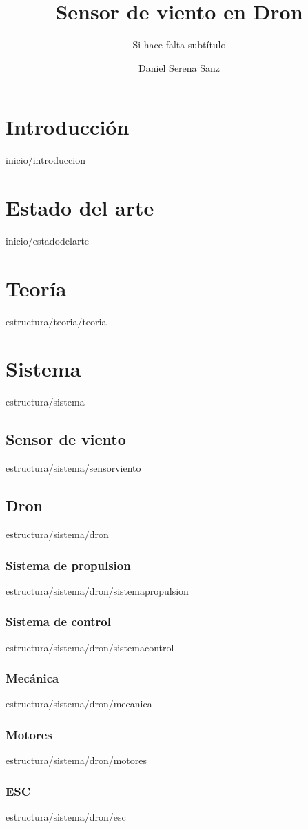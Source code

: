 \documentclass[epsbased,copyright,final,printable,covers,extendedindex,firstnumbered,tfg,gnuplot]{tfgtfmthesisuam}
\title{Sensor de viento en Dron}
\subtitle{Si hace falta subtítulo}
\author{Daniel Serena Sanz}
\begin{document}
\chapter{Introducción\label{CAP:INTRODUCCION}}{inicio/introduccion}
\chapter{Estado del arte\label{CAP:ESTADODELARTE}}{inicio/estadodelarte}
\chapter{Teoría\label{CAP:INTRODUCCION}}{estructura/teoria/teoria}
\chapter{Sistema\label{CAP:SISTEMA}}{estructura/sistema}

	\section{Sensor de viento\label{SEC:SENSORVIENTO}}{estructura/sistema/sensorviento}

	\section{Dron\label{SEC:DRON}}{estructura/sistema/dron}
		\subsection{Sistema de propulsion\label{SS:SISTPROPULSION}}{estructura/sistema/dron/sistemapropulsion}
		\subsection{Sistema de control\label{SS:SISTCONTROL}}{estructura/sistema/dron/sistemacontrol}
		\subsection{Mecánica\label{SS:MECANICA}}{estructura/sistema/dron/mecanica}
		
		\subsection{Motores\label{SS:MOTORES}}{estructura/sistema/dron/motores}
		\subsection{ESC\label{SS:ESC}}{estructura/sistema/dron/esc}
\end{document}

